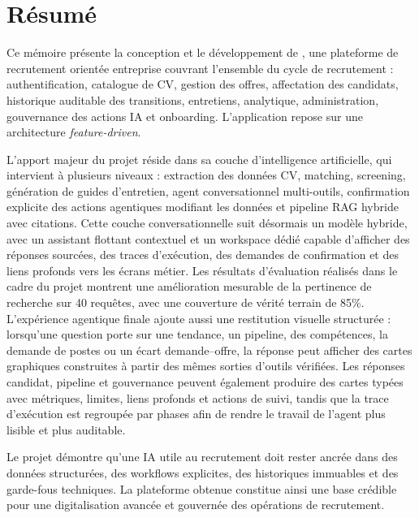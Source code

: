 \chapter*{Résumé}

Ce mémoire présente la conception et le développement de \projectname{}, une plateforme de recrutement orientée entreprise couvrant l'ensemble du cycle de recrutement : authentification, catalogue de CV, gestion des offres, affectation des candidats, historique auditable des transitions, entretiens, analytique, administration, gouvernance des actions IA et onboarding. L'application repose sur une architecture \textit{feature-driven}.

L'apport majeur du projet réside dans sa couche d'intelligence artificielle, qui intervient à plusieurs niveaux : extraction des données CV, matching, screening, génération de guides d'entretien, agent conversationnel multi-outils, confirmation explicite des actions agentiques modifiant les données et pipeline RAG hybride avec citations. Cette couche conversationnelle suit désormais un modèle hybride, avec un assistant flottant contextuel et un workspace dédié  capable d'afficher des réponses sourcées, des traces d'exécution, des demandes de confirmation et des liens profonds vers les écrans métier. Les résultats d'évaluation réalisés dans le cadre du projet montrent une amélioration mesurable de la pertinence de recherche sur 40 requêtes, avec une couverture de vérité terrain de 85\%.
L'expérience agentique finale ajoute aussi une restitution visuelle structurée : lorsqu'une question porte sur une tendance, un pipeline, des compétences, la demande de postes ou un écart demande--offre, la réponse peut afficher des cartes graphiques construites à partir des mêmes sorties d'outils vérifiées. Les réponses candidat, pipeline et gouvernance peuvent également produire des cartes typées avec métriques, limites, liens profonds et actions de suivi, tandis que la trace d'exécution est regroupée par phases afin de rendre le travail de l'agent plus lisible et plus auditable.

Le projet démontre qu'une IA utile au recrutement doit rester ancrée dans des données structurées, des workflows explicites, des historiques immuables et des garde-fous techniques. La plateforme obtenue constitue ainsi une base crédible pour une digitalisation avancée et gouvernée des opérations de recrutement.
